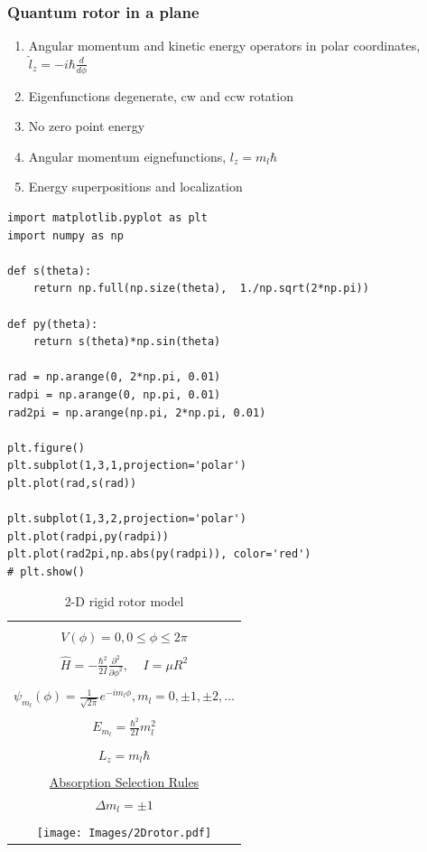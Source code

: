 \documentclass[11pt]{article}
\begin{document}
\subsubsection{Quantum rotor in a plane}
\label{sec:org149e6b7}
\begin{enumerate}
\item Angular momentum and kinetic energy operators in polar coordinates,
\(\hat l_z = -i\hbar \frac{d}{d\phi}\)
\item Eigenfunctions degenerate, cw and ccw rotation
\item No zero point energy
\item Angular momentum eignefunctions, \(l_z = m_l \hbar\)
\item Energy superpositions and localization
\end{enumerate}

\begin{verbatim}
import matplotlib.pyplot as plt
import numpy as np

def s(theta):
    return np.full(np.size(theta),  1./np.sqrt(2*np.pi))

def py(theta):
    return s(theta)*np.sin(theta)

rad = np.arange(0, 2*np.pi, 0.01)
radpi = np.arange(0, np.pi, 0.01)
rad2pi = np.arange(np.pi, 2*np.pi, 0.01)

plt.figure()
plt.subplot(1,3,1,projection='polar')
plt.plot(rad,s(rad))

plt.subplot(1,3,2,projection='polar')
plt.plot(radpi,py(radpi))
plt.plot(rad2pi,np.abs(py(radpi)), color='red')
# plt.show()
\end{verbatim}

\begin{table}[tbh]
   \begin{center}
   \caption{2-D rigid rotor model}
    \label{Rigid rotor}
\begin{tabular}[h]{|c|}
\hline
 \\
$\displaystyle       V(\phi) = 0, 0 \leq \phi \leq 2\pi $ \\
 \\
$\displaystyle \hat H = -\frac{\hbar^2}{2 I} \frac{\partial^2}{\partial
  \phi^2},\ \ \ \ \ I=\mu R^2
$\\
\\
$\displaystyle     \psi_{m_l}(\phi) = \frac{1}{\sqrt{2\pi}} e^{-i m_l \phi}, m_l
= 0, \pm 1, \pm 2, \ldots $ \\
\\
$\displaystyle     E_{m_l}=\frac{\hbar^2}{2 I}m_l^2$ \\
 \\
$\displaystyle L_z = m_l \hbar$ \\
\\ \underline{Absorption Selection Rules} \\
$\displaystyle \Delta m_l = \pm 1 $
\\
\\
     \texttt{[image: Images/2Drotor.pdf]} \\       
\hline
\end{tabular}
 \end{center}
\end{table}
\end{document}
